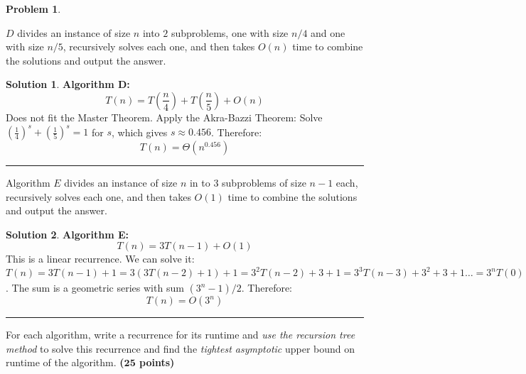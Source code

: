 \documentclass{article}
\theoremstyle{definition}
\newtheorem{problem}{Problem}
\def\fline{\rule{0.75\linewidth}{0.5pt}}
\newcommand{\finishline}{\begin{center}\fline\end{center}}
\newtheorem*{solution*}{Solution}
\newenvironment{solution}{\begin{solution*}}{{\finishline} \end{solution*}}
\newcommand{\grade}[1]{\hfill{\textbf{($\mathbf{#1}$ points)}}}
\begin{document}
\begin{problem}
\begin{enumerate}[label=(\Alph*)]
\item $D$ divides an instance of size $n$ into $2$ subproblems, one with size $n/4$ and one with size $n/5$, recursively solves each one, and then takes $O(n)$ time 
		to combine the solutions and output the answer.   	
		
		\begin{solution}
			\item \textbf{Algorithm D:}
			\[
			T(n) = T\left(\frac{n}{4}\right) + T\left(\frac{n}{5}\right) + O(n)
			\]
			Does not fit the Master Theorem. Apply the Akra-Bazzi Theorem:
			Solve $\left(\frac{1}{4}\right)^s + \left(\frac{1}{5}\right)^s = 1$ for $s$, which gives $s \approx 0.456$. Therefore:
			\[
			T(n) = \Theta(n^{0.456})
			\]
		\end{solution}

\item Algorithm $E$ divides an instance of size $n$ in to $3$ subproblems of size $n-1$ each, recursively solves each one, and then takes $O(1)$ time to combine the solutions and output the answer. 	  	
		
		\begin{solution}
			\item \textbf{Algorithm E:}
			\[
			T(n) = 3T(n-1) + O(1)
			\]
			This is a linear recurrence. We can solve it: $T(n) = 3T(n-1) + 1 = 3(3T(n-2) + 1) + 1 = 3^2T(n-2) + 3 + 1 = 3^3T(n-3) + 3^2 + 3 + 1 \ldots = 3^nT(0) + (3^{n-1} + 3^{n-2} + \ldots + 3 + 1)$. The sum is a geometric series with sum $(3^n - 1)/2$. Therefore:
			\[
			T(n) = O(3^n)
			\]
		\end{solution}


	\end{enumerate}
	
	For each algorithm, write a recurrence for its runtime and \emph{use the recursion tree method} to solve this recurrence and find the \emph{tightest asymptotic} upper bound on runtime of the algorithm. \grade{25} 
\end{problem}

\smallskip
\end{document}
